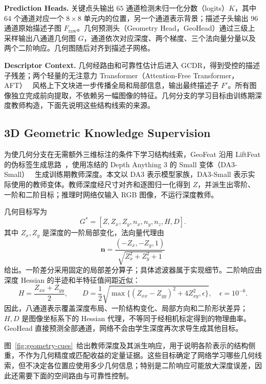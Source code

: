 \documentclass{article}
\begin{document}
\noindent\textbf{Prediction Heads.} 关键点头输出 $65$ 通道检测未归一化分数（logits）$K$，其中 $64$ 个通道对应一个 $8\times8$ 单元内的位置，另一个通道表示背景；描述子头输出 $96$ 通道原始描述子图 $F_{\mathrm{raw}}$。几何预测头（Geometry Head，GeoHead）通过三级上采样输出八通道几何图 $G$，通道依次对应深度、两个梯度、三个法向量分量以及两个二阶响应。几何图随后对齐到描述子网格。

\noindent\textbf{Descriptor Context.} 几何经路由和可靠性估计后进入 GCDR，得到受控的描述子残差；两个轻量的无注意力 Transformer（Attention-Free Transformer，AFT）~\cite{Zhai2021AFT} 风格上下文块进一步传播全局和局部信息，输出最终描述子 $F'$。所有图像独立完成前向提取，不依赖另一幅图像的特征。几何分支的学习目标由训练期深度教师构造，下面先说明这些结构线索的来源。

\subsection{3D Geometric Knowledge Supervision}
\label{sec:geometry}
为使几何分支在无需额外三维标注的条件下学习结构线索，GeoFeat 沿用 LiftFeat 的伪标签生成思路~\cite{LiftFeat}，使用冻结的 Depth Anything 3 的 Small 变体（DA3-Small）~\cite{Lin2025DepthAnything3} 生成训练期教师深度。本文以 DA3 表示模型家族，DA3-Small 表示实际使用的教师变体。教师深度经尺寸对齐和逐图归一化得到 $Z$，并派生出零阶、一阶和二阶目标；推理时网络仅输入 RGB 图像，不运行深度教师。

几何目标写为
\begin{equation}
G^*=[Z,Z_x,Z_y,n_x,n_y,n_z,H,D].
\label{eq:geometry-target}
\end{equation}
其中 $Z_x,Z_y$ 是深度的一阶局部变化，法向量代理由
\begin{equation}
\mathbf n=\frac{(-Z_x,-Z_y,1)}{\sqrt{Z_x^2+Z_y^2+1}}
\end{equation}
给出。一阶差分采用固定的局部差分算子；具体滤波器属于实现细节。二阶响应由深度 Hessian 的半迹和半特征值间距近似：
\begin{equation}
H=\frac{Z_{xx}+Z_{yy}}{2},\qquad
D=\frac12\sqrt{\max\{(Z_{xx}-Z_{yy})^2+4Z_{xy}^2,\epsilon\}},
\quad \epsilon=10^{-6}.
\label{eq:hessian-geometry}
\end{equation}
因此，八通道表示覆盖深度布局、一阶结构变化、局部方向和二阶形状差异；$H,D$ 是图像坐标系下的 Hessian 代理，不等同于经相机标定得到的物理曲率。GeoHead 直接预测全部通道，网络不会由学生深度再次求导生成其他目标。

图~\ref{fig:geometry-cues}~给出教师深度及其派生响应，用于说明各阶表示的结构侧重，不作为几何精度或匹配收益的定量证据。这些目标确定了网络学习哪些几何线索，但不决定各位置应使用多少几何信息；特别是二阶响应可能放大深度误差，因此还需要下面的空间路由与可靠性控制。
\end{document}

